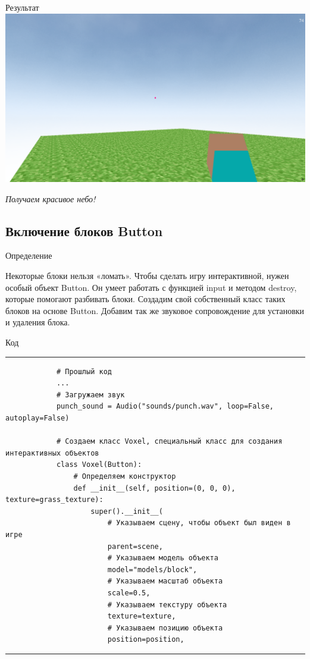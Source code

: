 \documentclass[handout]{beamer}
\begin{document}
    \begin{frame}{Результат}
        \includegraphics[width=\textwidth]{img/6.png}
        \begin{center}
            \textit{Получаем красивое небо!}
        \end{center}
    \end{frame}


    \subsection{Включение блоков Button}
    \begin{frame}{Определение}
        \begin{justify}
            Некоторые блоки нельзя «ломать». Чтобы сделать игру интерактивной, нужен особый объект Button. Он умеет работать с функцией input и методом destroy, которые помогают разбивать блоки. Создадим свой собственный класс таких блоков на основе Button. Добавим так же звуковое сопровождение для установки и удаления блока.
        \end{justify}
    \end{frame}

    \begin{frame}[fragile]{Код}
        \scriptsize
        \rule{\textwidth}{1pt}
        \begin{verbatim}
            # Прошлый код
            ...
            # Загружаем звук
            punch_sound = Audio("sounds/punch.wav", loop=False, autoplay=False)
            
            # Создаем класс Voxel, специальный класс для создания интерактивных объектов
            class Voxel(Button):
            	# Определяем конструктор
            	def __init__(self, position=(0, 0, 0), texture=grass_texture):
            		super().__init__(
            			# Указываем сцену, чтобы объект был виден в игре
            			parent=scene,
            			# Указываем модель объекта
            			model="models/block",
            			# Указываем масштаб объекта
            			scale=0.5,
            			# Указываем текстуру объекта
            			texture=texture,
            			# Указываем позицию объекта
            			position=position,
        \end{verbatim}
        \rule{\textwidth}{1pt}
    \end{frame}
\end{document}
